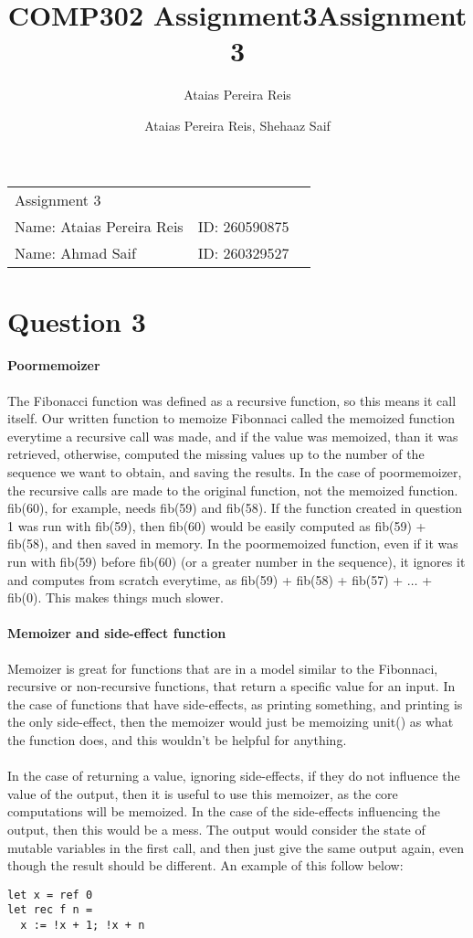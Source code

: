\documentclass[letterpaper,10pt]{article}
\title{COMP302 Assignment3}
\author{Ataias Pereira Reis}
\title{Assignment 3}
\author{Ataias Pereira Reis, Shehaaz Saif}
\begin{document}
\begin{tabular}{lll}
Assignment 3 & \\
Name: Ataias Pereira Reis & ID: 260590875\\
Name: Ahmad Saif & ID: 260329527\\
\end{tabular}

\section*{Question 3}
\paragraph{Poormemoizer} The Fibonacci function was defined as a recursive function, so this means it call itself. Our written function to memoize Fibonnaci called the memoized function everytime a recursive call was made, and if the value was memoized, than it was retrieved, otherwise, computed the missing values up to the number of the sequence we want to obtain, and saving the results. In the case of poormemoizer, the recursive calls are made to the original function, not the memoized function. fib(60), for example, needs fib(59) and fib(58). If the function created in question 1 was run with fib(59), then fib(60) would be easily computed as fib(59) + fib(58), and then saved in memory. In the poormemoized function, even if it was run with fib(59) before fib(60) (or a greater number in the sequence), it ignores it and computes from scratch everytime, as fib(59) + fib(58) + fib(57) + $\ldots$ + fib(0). This makes things much slower.
\paragraph{Memoizer and side-effect function} Memoizer is great for functions that are in a model similar to the Fibonnaci, recursive or non-recursive functions, that return a specific value for an input. In the case of functions that have side-effects, as printing something, and printing is the only side-effect, then the memoizer would just be memoizing unit() as what the function does, and this wouldn't be helpful for anything.
\paragraph{} In the case of returning a value, ignoring side-effects, if they do not influence the value of the output, then it is useful to use this memoizer, as the core computations will be memoized. In the case of the side-effects influencing the output, then this would be a mess. The output would consider the state of mutable variables in the first call, and then just give the same output again, even though the result should be different. An example of this follow below:
\begin{verbatim}
let x = ref 0
let rec f n = 
  x := !x + 1; !x + n
\end{verbatim}
\end{document}
